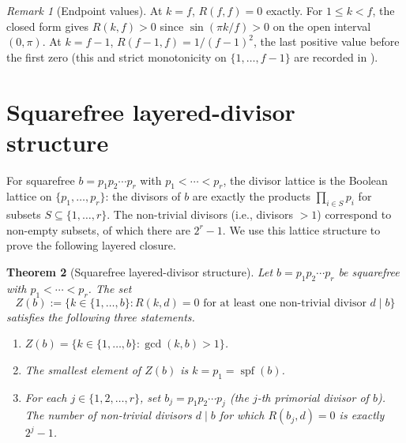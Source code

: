 \documentclass[11pt,reqno]{amsart}
\theoremstyle{plain}
\newtheorem{theorem}{Theorem}[section]
\theoremstyle{definition}
\theoremstyle{remark}
\newtheorem{remark}[theorem]{Remark}
\DeclareMathOperator{\spf}{spf}
\begin{document}
\begin{remark}[Endpoint values]\label{rem:endpoints}
At $k = f$, $R(f, f) = 0$ exactly. For $1 \le k < f$, the closed form
gives $R(k, f) > 0$ since $\sin(\pi k/f) > 0$ on the open interval
$(0, \pi)$. At $k = f - 1$, $R(f-1, f) = 1/(f-1)^{2}$, the last
positive value before the first zero (this and strict monotonicity
on $\{1, \ldots, f-1\}$ are recorded in
\cite[Cor.~4.4]{SandersGish2026FirstG}).
\end{remark}

\section{Squarefree layered-divisor structure}\label{sec:layered}

For squarefree $b = p_1 p_2 \cdots p_r$ with $p_{1} < \cdots < p_{r}$,
the divisor lattice is the Boolean lattice on $\{p_{1}, \ldots, p_{r}\}$:
the divisors of $b$ are exactly the products $\prod_{i \in S} p_{i}$
for subsets $S \subseteq \{1, \ldots, r\}$. The non-trivial divisors
(i.e., divisors $> 1$) correspond to non-empty subsets, of which there
are $2^{r} - 1$. We use this lattice structure to prove the following
layered closure.

\begin{theorem}[Squarefree layered-divisor structure]\label{thm:layered}
Let $b = p_{1} p_{2} \cdots p_{r}$ be squarefree with $p_{1} < \cdots <
p_{r}$. The set
\[
  Z(b) := \{k \in \{1, \ldots, b\} : R(k, d) = 0 \text{ for at least one
  non-trivial divisor } d \mid b\}
\]
satisfies the following three statements.
\begin{enumerate}[label={\upshape(\roman*)}]
\item $Z(b) = \{k \in \{1, \ldots, b\} : \gcd(k, b) > 1\}$.
\item The smallest element of $Z(b)$ is $k = p_{1} = \spf(b)$.
\item For each $j \in \{1, 2, \ldots, r\}$, set $b_{j} = p_{1} p_{2}
\cdots p_{j}$ (the $j$-th primorial divisor of $b$). The number of
non-trivial divisors $d \mid b$ for which $R(b_{j}, d) = 0$ is
exactly $2^{j} - 1$.
\end{enumerate}
\end{theorem}
\end{document}
